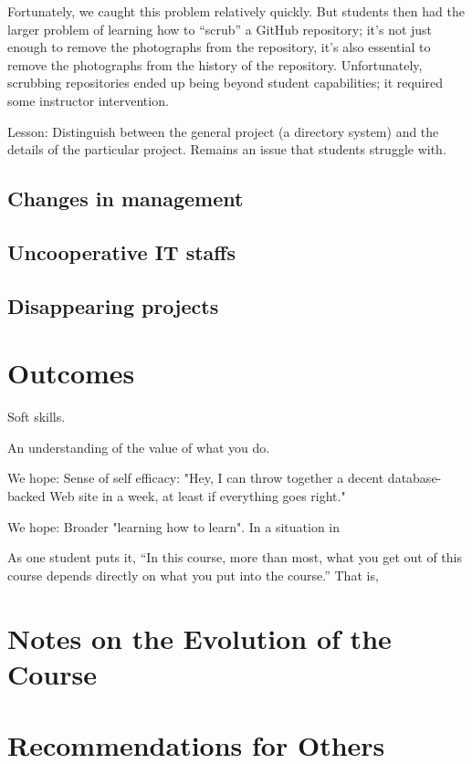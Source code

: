 Fortunately, we caught this problem relatively quickly.  But students
then had the larger problem of learning how to ``scrub'' a GitHub
repository; it's not just enough to remove the photographs from the
repository, it's also essential to remove the photographs from the
history of the repository.  Unfortunately, scrubbing repositories
ended up being beyond student capabilities; it required some
instructor intervention.

Lesson: Distinguish between the general project (a directory system) and
the details of the particular project.  Remains an issue that students
struggle with.

\subsection{Changes in management}

\subsection{Uncooperative IT staffs}

\subsection{Disappearing projects}

\section{Outcomes}

Soft skills.

An understanding of the value of what you do.

We hope: Sense of self efficacy: "Hey, I can throw together a decent
database-backed Web site in a week, at least if everything goes right."

We hope: Broader "learning how to learn".  In a situation in 

As one student puts it, ``In this course, more than most, what you get
out of this course depends directly on what you put into the course.''
That is,

\section{Notes on the Evolution of the Course}

\section{Recommendations for Others}

